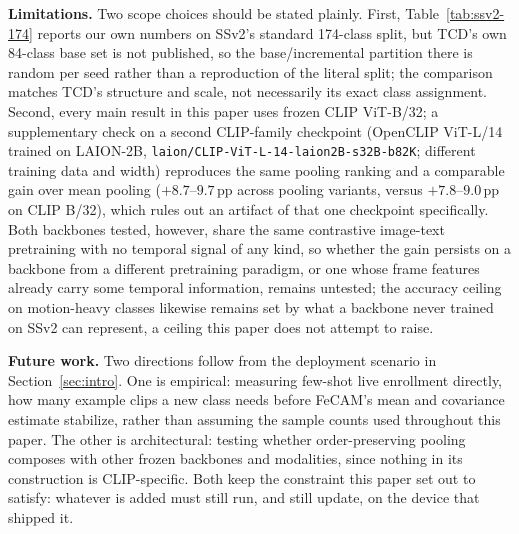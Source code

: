 \documentclass[11pt]{article}
\begin{document}
\textbf{Limitations.} Two scope choices should be stated plainly. First,
Table~\ref{tab:ssv2-174} reports our own numbers on SSv2's standard
174-class split, but TCD's own 84-class base set is not published, so the
base/incremental partition there is random per seed rather than a
reproduction of the literal split; the comparison matches TCD's structure
and scale, not necessarily its exact class assignment. Second, every main
result in this paper uses frozen CLIP ViT-B/32; a supplementary check on a
second CLIP-family checkpoint (OpenCLIP ViT-L/14 trained on LAION-2B,
\texttt{laion/CLIP-ViT-L-14-laion2B-s32B-b82K}; different
training data and width) reproduces the same pooling ranking and a comparable gain over
mean pooling ($+8.7$--$9.7$\,pp across pooling variants, versus
$+7.8$--$9.0$\,pp on CLIP B/32), which rules out an artifact of that one
checkpoint specifically. Both backbones tested, however, share the same
contrastive image-text pretraining with no temporal signal of any kind, so
whether the gain persists on a backbone from a different pretraining
paradigm, or one whose frame features already carry some temporal
information, remains untested; the accuracy ceiling on motion-heavy
classes likewise remains set by what a backbone never trained on SSv2 can
represent, a ceiling this paper does not attempt to raise.

\textbf{Future work.} Two directions follow from the deployment scenario
in Section~\ref{sec:intro}. One is empirical: measuring few-shot live
enrollment directly, how many example clips a new class needs before
FeCAM's mean and covariance estimate stabilize, rather than assuming the
sample counts used throughout this paper. The other is architectural:
testing whether order-preserving pooling composes with other frozen
backbones and modalities, since nothing in its construction is
CLIP-specific. Both keep the constraint this paper set out to satisfy:
whatever is added must still run, and still update, on the device that
shipped it.
\end{document}

